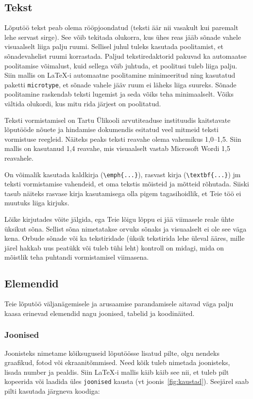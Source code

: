 \subsection{Tekst}
Lõputöö tekst peab olema rööpjoondatud (teksti äär nii vasakult kui paremalt lehe servast sirge). See võib tekitada olukorra, kus ühes reas jääb sõnade vahele visuaalselt liiga palju ruumi. Sellisel juhul tuleks kasutada poolitamist, et sõnadevahelist ruumi korrastada. Paljud tekstiredaktorid pakuvad ka automaatse poolitamise võimalust, kuid sellega võib juhtuda, et poolitusi tuleb liiga palju. Siin mallis on LaTeX-i automaatne poolitamine minimeeritud ning kasutatud paketti \verb|microtype|, et sõnade vahele jääv ruum ei läheks liiga suureks. Sõnade poolitamine raskendab teksti lugemist ja seda võiks teha minimaalselt. Võiks vältida olukordi, kus mitu rida järjest on poolitatud.

Teksti vormistamisel on Tartu Ülikooli arvutiteaduse instituudis kaitstavate lõputööde nõuete ja hindamise dokumendis esitatud veel mitmeid teksti vormistuse reegleid. Näiteks peaks teksti reavahe olema vahemikus 1,0–1,5. Siin mallis on kasutanud 1,4 reavahe, mis visuaalselt vastab Microsoft Wordi 1,5 reavahele.

On võimalik kasutada kaldkirja (\verb|\emph{...}|), rasvast kirja (\verb|\textbf{...}|) jm teksti vormistamise vahendeid, et oma tekstis mõisteid ja mõtteid rõhutada. Siiski tasub näiteks rasvase kirja kasutamisega olla pigem tagasihoidlik, et Teie töö ei muutuks liiga kirjuks.

Lõike kirjutades võite jälgida, ega Teie lõigu lõppu ei jää viimasele reale ühte üksikut sõna. Sellist sõna nimetatakse orvuks sõnaks ja visuaalselt ei ole see väga kena. Orbude sõnade või ka tekstiridade (üksik tekstirida lehe üleval ääres, mille järel hakkab uus peatükk või tuleb tühi leht) kontroll on midagi, mida on mõistlik teha puhtandi vormistamisel viimasena.

\subsection{Elemendid}
Teie lõputöö väljanägemisele ja arusaamise parandamisele aitavad väga palju kaasa erinevad elemendid nagu joonised, tabelid ja koodinäited.

\subsubsection{Joonised}
Joonisteks nimetame kõiksuguseid lõputöösse lisatud pilte, olgu nendeks graafikud, fotod või ekraanitõmmised. Need kõik tuleb nimetada joonisteks, lisada number ja pealdis. Siin LaTeX-i mallis käib käib see nii, et tuleb pilt kopeerida või laadida üles \verb|joonised| kausta (vt joonis~\ref{fig:kaustad}). Seejärel saab pilti kasutada järgneva koodiga:

